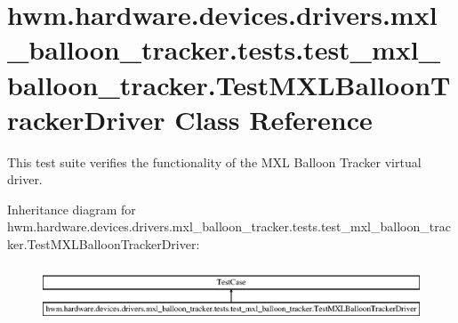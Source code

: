 \hypertarget{classhwm_1_1hardware_1_1devices_1_1drivers_1_1mxl__balloon__tracker_1_1tests_1_1test__mxl__ballodf60623d41e11143100d8361dee24ac6}{\section{hwm.\-hardware.\-devices.\-drivers.\-mxl\-\_\-balloon\-\_\-tracker.\-tests.\-test\-\_\-mxl\-\_\-balloon\-\_\-tracker.\-Test\-M\-X\-L\-Balloon\-Tracker\-Driver Class Reference}
\label{classhwm_1_1hardware_1_1devices_1_1drivers_1_1mxl__balloon__tracker_1_1tests_1_1test__mxl__ballodf60623d41e11143100d8361dee24ac6}
}


This test suite verifies the functionality of the M\-X\-L Balloon Tracker virtual driver.  


Inheritance diagram for hwm.\-hardware.\-devices.\-drivers.\-mxl\-\_\-balloon\-\_\-tracker.\-tests.\-test\-\_\-mxl\-\_\-balloon\-\_\-tracker.\-Test\-M\-X\-L\-Balloon\-Tracker\-Driver\-:\begin{figure}[H]
\begin{center}
\leavevmode
\includegraphics[height=1.696970cm]{classhwm_1_1hardware_1_1devices_1_1drivers_1_1mxl__balloon__tracker_1_1tests_1_1test__mxl__ballodf60623d41e11143100d8361dee24ac6}
\end{center}
\end{figure}
